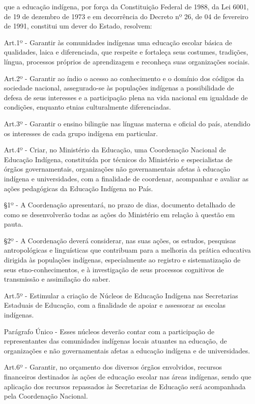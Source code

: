 \documentclass[
]{book}
\begin{document}
que a educação indígena, por força da Constituição Federal de 1988, da Lei 6001, de 19 de dezembro de 1973 e em decorrência do Decreto nº 26, de 04 de fevereiro de 1991, constitui um dever do Estado, resolvem:

Art.1º - Garantir às comunidades indígenas uma educação escolar básica de qualidades, laica e diferenciada, que respeite e fortaleça seus costumes, tradições, língua, processos próprios de aprendizagem e reconheça suas organizações sociais.

Art.2º - Garantir ao índio o acesso ao conhecimento e o domínio dos códigos da sociedade nacional, assegurado-se às populações indígenas a possibilidade de defesa de seus interesses e a participação plena na vida nacional em igualdade de condições, enquanto etnias culturalmente diferenciadas.

Art.3º - Garantir o ensino bilingüe nas línguas materna e oficial do país, atendido os interesses de cada grupo indígena em particular.

Art.4º - Criar, no Ministério da Educação, uma Coordenação Nacional de Educação Indígena, constituída por técnicos do Ministério e especialistas de órgãos governamentais, organizações não governamentais afetas à educação indígena e universidades, com a finalidade de coordenar, acompanhar e avaliar as ações pedagógicas da Educação Indígena no País.

§1º - A Coordenação apresentará, no prazo de dias, documento detalhado de como se desenvolverão todas as ações do Ministério em relação à questão em pauta.

§2º - A Coordenação deverá considerar, nas suas ações, os estudos, pesquisas antropológicas e linguísticas que contribuam para a melhoria da prática educativa dirigida às populações indígenas, especialmente ao registro e sistematização de seus etno-conhecimentos, e à investigação de seus processos cognitivos de transmissão e assimilação do saber.

Art.5º - Estimular a criação de Núcleos de Educação Indígena nas Secretarias Estaduais de Educação, com a finalidade de apoiar e assessorar as escolas indígenas.

Parágrafo Único - Esses núcleos deverão contar com a participação de representantes das comunidades indígenas locais atuantes na educação, de organizações e não governamentais afetas a educação indígena e de universidades.

Art.6º - Garantir, no orçamento dos diversos órgãos envolvidos, recursos financeiros destinados às ações de educação escolar nas áreas indígenas, sendo que aplicação dos recursos repassados às Secretarias de Educação será acompanhada pela Coordenação Nacional.
\end{document}
